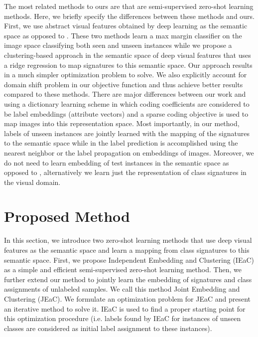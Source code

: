 \documentclass[10pt,twocolumn,letterpaper]{article}
\begin{document}
The most related methods to ours are \cite{li15max,Kodirov2015,semi15}
 that are semi-supervised zero-shot learning methods.
Here, we briefly specify the differences between these methods and ours.
 First, we use abstract visual features obtained by deep learning as the semantic space as opposed to \cite{li15max,semi15}.
 These two methods learn a max margin classifier on the image space classifying both seen and unseen
instances while we propose a clustering-based approach in the semantic space of deep visual features that uses a ridge regression to map signatures to this semantic space. Our approach results in a much simpler optimization problem to solve.
 We also explicitly account for domain shift problem in our objective function and thus achieve better results compared to these methods.
%
There are major differences between our work and ~\cite{Kodirov2015} using a dictionary learning scheme
in which coding coefficients are considered to be label embeddings (attribute vectors) and a sparse coding objective is used to map images into this representation space.
Most importantly, in our method, labels of unseen instances are jointly learned
with the mapping of the signatures to the semantic space while in \cite{Kodirov2015}
the label prediction is accomplished using the nearest neighbor or the label propagation on embeddings of images.
Moreover, we do not need to learn embedding of test instances in the semantic space as opposed to \cite{Kodirov2015},
alternatively we learn just the representation of class signatures in the visual domain.

\section{Proposed Method} \label{proposed}
In this section, we introduce two zero-shot learning methods that use deep visual features as the semantic space and learn
a mapping from class signatures to this semantic space. %
 First, we propose Independent Embedding and Clustering (IEaC) as a simple and efficient semi-supervised zero-shot learning method.
Then, we further extend our method to jointly learn the embedding of signatures and class assignments of unlabeled samples.
We call this method Joint Embedding and Clustering (JEaC). We formulate an optimization problem for JEaC and
 present an iterative method to solve it.
IEaC is used to find a proper starting point for this optimization procedure
 (i.e. labels found by IEaC for instances of unseen classes are considered as initial label assignment to these instances).
\end{document}
